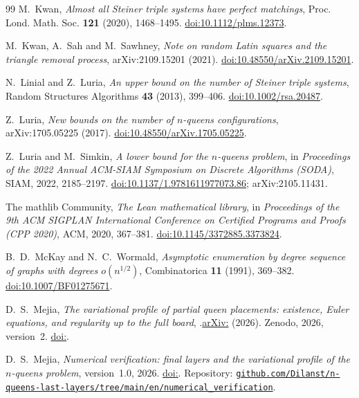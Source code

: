 \begin{thebibliography}{99}
 M.~Kwan, \emph{Almost all Steiner triple systems have perfect matchings},
Proc. Lond. Math. Soc. \textbf{121} (2020), 1468--1495.
\href{https://doi.org/10.1112/plms.12373}{doi:10.1112/plms.12373}.

 M.~Kwan, A.~Sah and M.~Sawhney, \emph{Note on random Latin squares and the triangle
removal process}, arXiv:2109.15201 (2021).
\href{https://doi.org/10.48550/arXiv.2109.15201}{doi:10.48550/arXiv.2109.15201}.

 N.~Linial and Z.~Luria, \emph{An upper bound on the number of Steiner triple
systems}, Random Structures Algorithms \textbf{43} (2013), 399--406.
\href{https://doi.org/10.1002/rsa.20487}{doi:10.1002/rsa.20487}.

 Z.~Luria, \emph{New bounds on the number of $n$-queens configurations},
arXiv:1705.05225 (2017).
\href{https://doi.org/10.48550/arXiv.1705.05225}{doi:10.48550/arXiv.1705.05225}.

 Z.~Luria and M.~Simkin, \emph{A lower bound for the $n$-queens problem}, in
\emph{Proceedings of the 2022 Annual ACM-SIAM Symposium on Discrete Algorithms (SODA)}, SIAM, 2022,
2185--2197.
\href{https://doi.org/10.1137/1.9781611977073.86}{doi:10.1137/1.9781611977073.86};
arXiv:2105.11431.

\ifverificacionLean
{} The mathlib Community, \emph{The Lean mathematical library}, in
\emph{Proceedings of the 9th ACM SIGPLAN International Conference on Certified Programs and Proofs
(CPP 2020)}, ACM, 2020, 367--381.
\href{https://doi.org/10.1145/3372885.3373824}{doi:10.1145/3372885.3373824}.
\fi

 B.~D.~McKay and N.~C.~Wormald, \emph{Asymptotic enumeration by degree sequence
of graphs with degrees $o(n^{1/2})$}, Combinatorica \textbf{11} (1991), 369--382.
\href{https://doi.org/10.1007/BF01275671}{doi:10.1007/BF01275671}.

 D.~S.~Mejia,
\emph{The variational profile of partial queen placements: existence, Euler equations, and regularity up to
the full board},
\ifx\DOIPerfil\empty
\ifx\arXivPerfil{}.\else\href{https://arxiv.org/abs/\arXivPerfil}{arXiv:\arXivPerfil} (2026).\fi
\else Zenodo, 2026, version~2. \href{https://doi.org/\DOIPerfil}{doi:\DOIPerfil}.\fi

 D.~S.~Mejia, \emph{Numerical verification: final layers and the variational profile of the
$n$-queens problem}, version~1.0, 2026.
\ifx\DOIcodigo\empty\else\href{https://doi.org/\DOIcodigo}{doi:\DOIcodigo}. \fi
Repository:
\href{https://github.com/Dilanst/n-queens-last-layers/tree/main/en/numerical_verification}%
{\nolinkurl{github.com/Dilanst/n-queens-last-layers/tree/main/en/numerical_verification}}.


\end{thebibliography}
